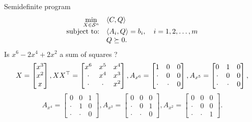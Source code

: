 \begin{frame}{Semidefinite program}
      \begin{equation*}
        \label{eq:sdp_standard}
        \begin{array}{rl}
          \min\limits_{X \in \mathcal{S}^n} & \langle C, Q \rangle\\
          \text{subject to:} & \langle A_i, Q \rangle = b_i, \quad i=1,2,\ldots,m\\
          & Q \succeq 0.
        \end{array}
      \end{equation*}
      Is $x^6 - 2x^4 + 2x^2$ a sum of squares ?
      $$
      X =
      \begin{bmatrix}
        x^3\\
        x^2\\
        x
      \end{bmatrix},
      XX^\top =
      \begin{bmatrix}
        x^6 & x^5 & x^4\\
        \cdot & x^4 & x^3\\
        \cdot & \cdot & x^2
      \end{bmatrix},
      A_{x^6} =
      \begin{bmatrix}
        1 & 0 & 0\\
        \cdot & 0 & 0\\
        \cdot & \cdot & 0
      \end{bmatrix},
      A_{x^5} =
      \begin{bmatrix}
        0 & 1 & 0\\
        \cdot & 0 & 0\\
        \cdot & \cdot & 0
      \end{bmatrix},
      $$
      $$
      A_{x^4} =
      \begin{bmatrix}
        0 & 0 & 1\\
        \cdot & 1 & 0\\
        \cdot & \cdot & 0
      \end{bmatrix},
      A_{x^3} =
      \begin{bmatrix}
        0 & 0 & 0\\
        \cdot & 0 & 1\\
        \cdot & \cdot & 0
      \end{bmatrix},
      A_{x^2} =
      \begin{bmatrix}
        0 & 0 & 0\\
        \cdot & 0 & 0\\
        \cdot & \cdot & 1
      \end{bmatrix}.
      $$

\end{frame}

